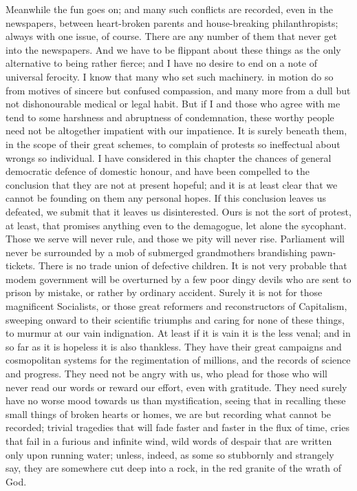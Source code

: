 \documentclass{book}
\begin{document}
Meanwhile the fun goes on; and many such conflicts are recorded, even in the newspapers, between heart-broken parents and house-breaking philanthropists; always with one issue, of course. There are any number of them that never get into the newspapers. And we have to be flippant about these things as the only alternative to being rather fierce; and I have no desire to end on a note of universal ferocity. I know that many who set such machinery. in motion do so from motives of sincere but confused compassion, and many more from a dull but not dishonourable medical or legal habit. But if I and those who agree with me tend to some harshness and abruptness of condemnation, these worthy people need not be altogether impatient with our impatience. It is surely beneath them, in the scope of their great schemes, to complain of protests so ineffectual about wrongs so individual. I have considered in this chapter the chances of general democratic defence of domestic honour, and have been compelled to the conclusion that they are not at present hopeful; and it is at least clear that we cannot be founding on them any personal hopes. If this conclusion leaves us defeated, we submit that it leaves us disinterested. Ours is not the sort of protest, at least, that promises anything even to the demagogue, let alone the sycophant. Those we serve will never rule, and those we pity will never rise. Parliament will never be surrounded by a mob of submerged grandmothers brandishing pawn-tickets. There is no trade union of defective children. It is not very probable that modem government will be overturned by a few poor dingy devils who are sent to prison by mistake, or rather by ordinary accident. Surely it is not for those magnificent Socialists, or those great reformers and reconstructors of Capitalism, sweeping onward to their scientific triumphs and caring for none of these things, to murmur at our vain indignation. At least if it is vain it is the less venal; and in so far as it is hopeless it is also thankless. They have their great campaigns and cosmopolitan systems for the regimentation of millions, and the records of science and progress. They need not be angry with us, who plead for those who will never read our words or reward our effort, even with gratitude. They need surely have no worse mood towards us than mystification, seeing that in recalling these small things of broken hearts or homes, we are but recording what cannot be recorded; trivial tragedies that will fade faster and faster in the flux of time, cries that fail in a furious and infinite wind, wild words of despair that are written only upon running water; unless, indeed, as some so stubbornly and strangely say, they are somewhere cut deep into a rock, in the red granite of the wrath of God.
\end{document}
